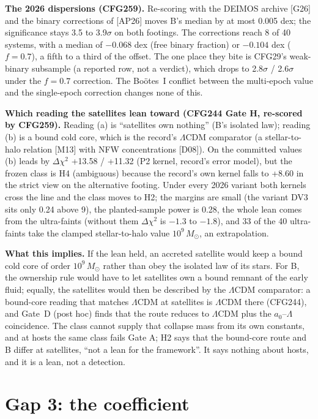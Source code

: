 \documentclass[10pt]{article}
\begin{document}
\textbf{The 2026 dispersions (CFG259).} Re-scoring with the DEIMOS archive [G26] and the binary corrections of [AP26] moves B's median by at most 0.005 dex; the significance stays 3.5 to 3.9$\sigma$ on both footings. The corrections reach 8 of 40 systems, with a median of $-0.068$ dex (free binary fraction) or $-0.104$ dex ($f=0.7$), a fifth to a third of the offset. The one place they bite is CFG29's weak-binary subsample (a reported row, not a verdict), which drops to 2.8$\sigma$ / 2.6$\sigma$ under the $f=0.7$ correction. The Bo\"otes~I conflict between the multi-epoch value and the single-epoch correction changes none of this.

\textbf{Which reading the satellites lean toward (CFG244 Gate H, re-scored by CFG259).} Reading (a) is ``satellites own nothing'' (B's isolated law); reading (b) is a bound cold core, which is the record's $\Lambda$CDM comparator (a stellar-to-halo relation [M13] with NFW concentrations [D08]). On the committed values (b) leads by $\Delta\chi^2$ +13.58 / +11.32 (P2 kernel, record's error model), but the frozen class is H4 (ambiguous) because the record's own kernel falls to +8.60 in the strict view on the alternative footing. Under every 2026 variant both kernels cross the line and the class moves to H2; the margins are small (the variant DV3 sits only 0.24 above 9), the planted-sample power is 0.28, the whole lean comes from the ultra-faints (without them $\Delta\chi^2$ is $-1.3$ to $-1.8$), and 33 of the 40 ultra-faints take the clamped stellar-to-halo value $10^9\,M_\odot$, an extrapolation.

\textbf{What this implies.} If the lean held, an accreted satellite would keep a bound cold core of order $10^9\,M_\odot$ rather than obey the isolated law of its stars. For B, the ownership rule would have to let satellites own a bound remnant of the early fluid; equally, the satellites would then be described by the $\Lambda$CDM comparator: a bound-core reading that matches $\Lambda$CDM at satellites is $\Lambda$CDM there (CFG244), and Gate~D (post hoc) finds that the route reduces to $\Lambda$CDM plus the $a_0$--$\Lambda$ coincidence. The class cannot supply that collapse mass from its own constants, and at hosts the same class fails Gate A; H2 says that the bound-core route and B differ at satellites, ``not a lean for the framework''. It says nothing about hosts, and it is a lean, not a detection.

\section{Gap 3: the coefficient}\label{sec:kappa}
\end{document}
